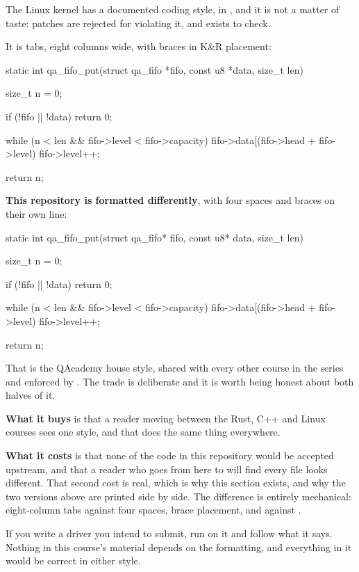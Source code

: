 The Linux kernel has a documented coding style, in ,
and it is not a matter of taste: patches are rejected for violating it, and
 exists to check.

It is tabs, eight columns wide, with braces in K\&R placement:

\begin{ccode}
static int qa_fifo_put(struct qa_fifo *fifo, const u8 *data, size_t len)
{
	size_t n = 0;

	if (!fifo || !data)
		return 0;

	while (n < len && fifo->level < fifo->capacity) {
		fifo->data[(fifo->head + fifo->level) %
		fifo->level++;
	}

	return n;
}
\end{ccode}

\noindent \textbf{This repository is formatted differently}, with four spaces and braces on their
own line:

\begin{ccode}
static int qa_fifo_put(struct qa_fifo* fifo, const u8* data, size_t len)
{
    size_t n = 0;

    if (!fifo || !data) { return 0; }

    while (n < len && fifo->level < fifo->capacity)
    {
        fifo->data[(fifo->head + fifo->level) %
        fifo->level++;
    }

    return n;
}
\end{ccode}

\noindent That is the QAcademy house style, shared with every other course in the series and
enforced by . The trade is deliberate and it is worth being honest about both
halves of it.

\textbf{What it buys} is that a reader moving between the Rust, C++ and Linux courses sees one
style, and that  does the same thing everywhere.

\textbf{What it costs} is that none of the code in this repository would be accepted upstream, and
that a reader who goes from here to  will find every file looks different. That
second cost is real, which is why this section exists, and why the two versions above are printed
side by side. The difference is entirely mechanical: eight-column tabs against four spaces, brace
placement, and  against .

If you write a driver you intend to submit, run  on it and follow
what it says. Nothing in this course's material depends on the formatting, and everything in it
would be correct in either style.
